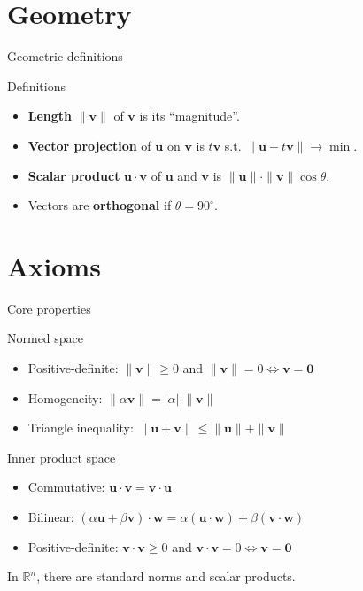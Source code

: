 \documentclass[10pt]{beamer}
\begin{document}
\section{Geometry}
\begin{frame}{Geometric definitions}
    \begin{center}
        
    \end{center}
    \begin{block}{Definitions}
        \begin{itemize}
            \item \textbf{Length} $\|\mathbf v\|$ of $\mathbf v$ is its ``magnitude''.
            \item \textbf{Vector projection} of $\mathbf u$ on $\mathbf v$ is $t \mathbf v$ s.t. $\|\mathbf u - t\mathbf v\| \to \min$.
            \item \textbf{Scalar product} $\mathbf u \cdot \mathbf v$ of $\mathbf u$ and $\mathbf v$ is $\|\mathbf u\| \cdot \|\mathbf v\| \cos \theta$.
            \item Vectors are \textbf{orthogonal} if $\theta=90^\circ$.
        \end{itemize}
    \end{block}
\end{frame}

\section{Axioms}
\begin{frame}{Core properties}
    \begin{block}{Normed space}
        \begin{itemize}
            \item Positive-definite: $\|\mathbf v\| \geq 0$ and $\|\mathbf v\| = 0 \iff \mathbf v = \mathbf 0$
            \item Homogeneity: $\|\alpha \mathbf v\| = |\alpha| \cdot \|\mathbf v\|$
            \item Triangle inequality: $\|\mathbf u + \mathbf v\| \leq \|\mathbf u\| + \|\mathbf v\|$
        \end{itemize}
    \end{block}
    \begin{block}{Inner product space}
    \begin{itemize}
        \item Commutative: $\mathbf u \cdot \mathbf v = \mathbf v \cdot \mathbf u$
        \item Bilinear: $(\alpha \mathbf u + \beta \mathbf v) \cdot \mathbf w = \alpha(\mathbf u \cdot \mathbf w) + \beta (\mathbf v \cdot \mathbf w)$
        \item Positive-definite: $\mathbf v \cdot \mathbf v \geq 0$ and $\mathbf v \cdot \mathbf v = 0 \iff \mathbf v = \mathbf 0$
    \end{itemize}
    \end{block}
    In $\mathbb R^n$, there are standard norms and scalar products.
\end{frame}
\end{document}
